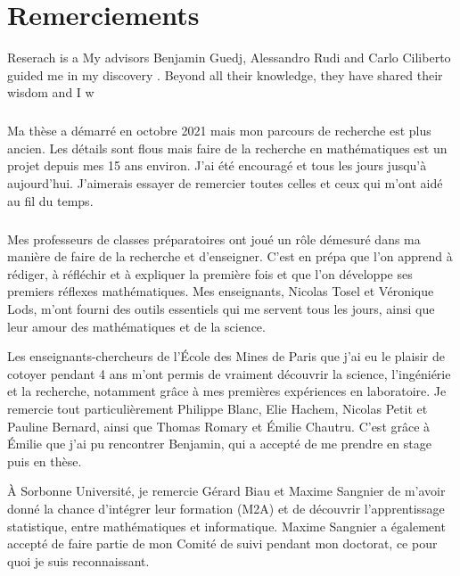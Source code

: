 \chapter{Remerciements}

Reserach is a My advisors Benjamin Guedj, Alessandro Rudi and Carlo Ciliberto guided me in my discovery . Beyond all their knowledge, they have shared their wisdom and I w

\paragraph{}

\paragraph{}
Ma thèse a démarré en octobre 2021 mais mon parcours de recherche est plus ancien. Les détails sont flous mais faire de la recherche en mathématiques est un projet depuis mes 15 ans environ. J'ai été encouragé et tous les jours jusqu'à aujourd'hui. J'aimerais essayer de remercier toutes celles et ceux qui m'ont aidé au fil du temps.



\paragraph{}
Mes professeurs de classes préparatoires ont joué un rôle démesuré dans ma manière de faire de la recherche et d'enseigner. C'est en prépa que l'on apprend à rédiger, à réfléchir et à expliquer la première fois et que l'on développe ses premiers réflexes mathématiques. Mes enseignants, Nicolas Tosel et Véronique Lods, m'ont fourni des outils essentiels qui me servent tous les jours, ainsi que leur amour des mathématiques et de la science.

Les enseignants-chercheurs de l'École des Mines de Paris que j'ai eu le plaisir de cotoyer pendant 4 ans m'ont permis de vraiment découvrir la science, l'ingéniérie et la recherche, notamment grâce à mes premières expériences en laboratoire. Je remercie tout particulièrement Philippe Blanc, Elie Hachem, Nicolas Petit et Pauline Bernard, ainsi que Thomas Romary et Émilie Chautru. C'est grâce à Émilie que j'ai pu rencontrer Benjamin, qui a accepté de me prendre en stage puis en thèse.

À Sorbonne Université, je remercie Gérard Biau et Maxime Sangnier de m'avoir donné la chance d'intégrer leur formation (M2A) et de découvrir l'apprentissage statistique, entre mathématiques et informatique. Maxime Sangnier a également accepté de faire partie de mon Comité de suivi pendant mon doctorat, ce pour quoi je suis reconnaissant.

